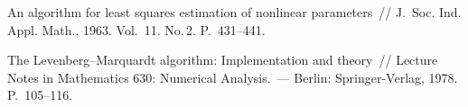 \begin{multicols}{2}
{{\begin{thebibliography}{99}
 An algorithm for least squares estimation of nonlinear parameters~// 
J.~Soc. Ind. Appl. Math., 1963. Vol.~11. No.\,2. P.~431--441.

\label{end\stat}


  
The Levenberg--Marquardt algorithm: Implementation and theory~// 
Lecture Notes in Mathematics 630: Numerical Analysis.~--- Berlin: Springer-Verlag,
1978. P.~105--116.
\end{thebibliography}
}
}

\end{multicols}